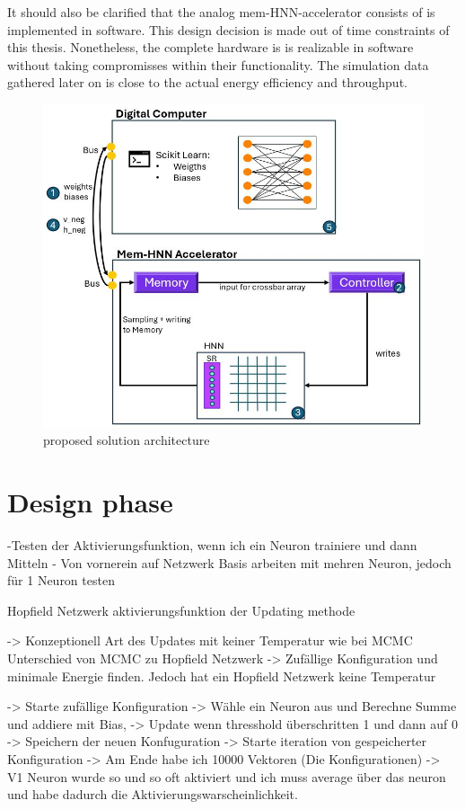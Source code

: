 It should also be clarified that the analog \ac{mem-HNN}-accelerator consists of is implemented in software. 
This design decision is made out of time constraints of this thesis. 
Nonetheless, the complete hardware is is realizable in software without taking compromisses within their functionality.
The simulation data gathered later on is close to the actual energy efficiency and throughput. 



\begin{figure}[H]
    \centering
    \includegraphics[width=0.80\linewidth]{graphics/Analysemodell.JPG}
    \caption{proposed solution architecture}
    \label{Overall architecture}
\end{figure}

\section{Design phase}



-Testen der Aktivierungsfunktion, wenn ich ein Neuron trainiere und dann Mitteln 
- Von vornerein auf Netzwerk Basis arbeiten mit mehren Neuron, jedoch für 1 Neuron testen



Hopfield Netzwerk aktivierungsfunktion der Updating methode

-> Konzeptionell Art des Updates mit keiner Temperatur wie bei MCMC 
Unterschied von MCMC zu Hopfield Netzwerk -> Zufällige Konfiguration und minimale Energie finden. Jedoch hat ein Hopfield
Netzwerk keine Temperatur 

-> Starte zufällige Konfiguration
-> Wähle ein Neuron aus und Berechne Summe und addiere mit Bias, 
-> Update wenn thresshold überschritten 1 und dann auf 0 
-> Speichern der neuen Konfuguration 
-> Starte iteration von gespeicherter Konfiguration 
-> Am Ende habe ich 10000 Vektoren (Die Konfigurationen) -> V1 Neuron wurde so und so oft aktiviert und ich muss average
über das neuron und habe dadurch die Aktivierungswarscheinlichkeit.

